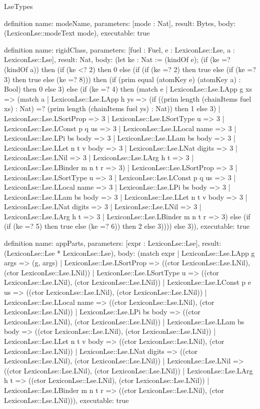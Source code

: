 \begin{lexlean}{LseTypes}
\begin{semanticmodule}
definition{
  name: modeName,
  parameters: [mode : Nat],
  result: Bytes,
  body: (LexiconLse::modeText mode),
  executable: true
}

definition{
  name: rigidClass,
  parameters: [fuel : Fuel, e : LexiconLse::Lse, a : LexiconLse::Lse],
  result: Nat,
  body: (let ke : Nat := (kindOf e); (if (ke =? (kindOf a)) then (if (ke <? 2) then 0 else (if (if (ke =? 2) then true else (if (ke =? 3) then true else (ke =? 8))) then (if (prim equal (atomKey e) (atomKey a) : Bool) then 0 else 3) else (if (ke =? 4) then (match e
    | LexiconLse::Lse.LApp g xs => (match a
      | LexiconLse::Lse.LApp h ys => (if ((prim length (chainItems fuel xs) : Nat) =? (prim length (chainItems fuel ys) : Nat)) then 1 else 3)
      | LexiconLse::Lse.LSortProp => 3
      | LexiconLse::Lse.LSortType u => 3
      | LexiconLse::Lse.LConst p q us => 3
      | LexiconLse::Lse.LLocal name => 3
      | LexiconLse::Lse.LPi bs body => 3
      | LexiconLse::Lse.LLam bs body => 3
      | LexiconLse::Lse.LLet n t v body => 3
      | LexiconLse::Lse.LNat digits => 3
      | LexiconLse::Lse.LNil => 3
      | LexiconLse::Lse.LArg h t => 3
      | LexiconLse::Lse.LBinder m n t r => 3)
    | LexiconLse::Lse.LSortProp => 3
    | LexiconLse::Lse.LSortType u => 3
    | LexiconLse::Lse.LConst p q us => 3
    | LexiconLse::Lse.LLocal name => 3
    | LexiconLse::Lse.LPi bs body => 3
    | LexiconLse::Lse.LLam bs body => 3
    | LexiconLse::Lse.LLet n t v body => 3
    | LexiconLse::Lse.LNat digits => 3
    | LexiconLse::Lse.LNil => 3
    | LexiconLse::Lse.LArg h t => 3
    | LexiconLse::Lse.LBinder m n t r => 3) else (if (if (ke =? 5) then true else (ke =? 6)) then 2 else 3)))) else 3)),
  executable: true
}

definition{
  name: appParts,
  parameters: [expr : LexiconLse::Lse],
  result: (LexiconLse::Lse * LexiconLse::Lse),
  body: (match expr
    | LexiconLse::Lse.LApp g args => (g, args)
    | LexiconLse::Lse.LSortProp => ((ctor LexiconLse::Lse.LNil), (ctor LexiconLse::Lse.LNil))
    | LexiconLse::Lse.LSortType u => ((ctor LexiconLse::Lse.LNil), (ctor LexiconLse::Lse.LNil))
    | LexiconLse::Lse.LConst p e us => ((ctor LexiconLse::Lse.LNil), (ctor LexiconLse::Lse.LNil))
    | LexiconLse::Lse.LLocal name => ((ctor LexiconLse::Lse.LNil), (ctor LexiconLse::Lse.LNil))
    | LexiconLse::Lse.LPi bs body => ((ctor LexiconLse::Lse.LNil), (ctor LexiconLse::Lse.LNil))
    | LexiconLse::Lse.LLam bs body => ((ctor LexiconLse::Lse.LNil), (ctor LexiconLse::Lse.LNil))
    | LexiconLse::Lse.LLet n t v body => ((ctor LexiconLse::Lse.LNil), (ctor LexiconLse::Lse.LNil))
    | LexiconLse::Lse.LNat digits => ((ctor LexiconLse::Lse.LNil), (ctor LexiconLse::Lse.LNil))
    | LexiconLse::Lse.LNil => ((ctor LexiconLse::Lse.LNil), (ctor LexiconLse::Lse.LNil))
    | LexiconLse::Lse.LArg h t => ((ctor LexiconLse::Lse.LNil), (ctor LexiconLse::Lse.LNil))
    | LexiconLse::Lse.LBinder m n t r => ((ctor LexiconLse::Lse.LNil), (ctor LexiconLse::Lse.LNil))),
  executable: true
}


\end{semanticmodule}
\end{lexlean}
